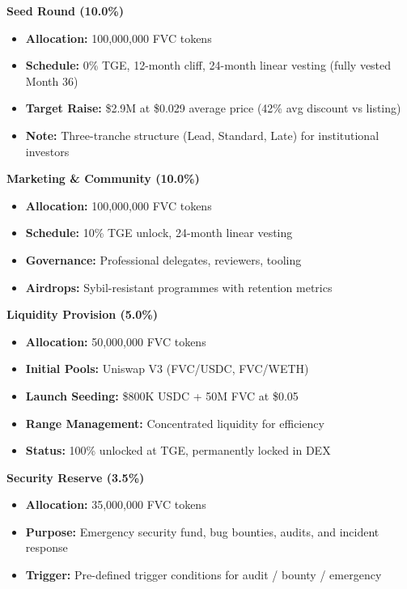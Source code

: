 \documentclass[
  paper=a4,
  ,captions=tableheading
]{scrartcl}
\providecommand{\tightlist}{%
  \setlength{\itemsep}{0pt}\setlength{\parskip}{0pt}}
\begin{document}
\textbf{Seed Round (10.0\%)}

\begin{itemize}
\tightlist
\item
  \textbf{Allocation:} 100,000,000 FVC tokens
\item
  \textbf{Schedule:} 0\% TGE, 12-month cliff, 24-month linear vesting (fully vested Month 36)
\item
  \textbf{Target Raise:} \$2.9M at \$0.029 average price (42\% avg discount vs listing)
\item
  \textbf{Note:} Three-tranche structure (Lead, Standard, Late) for institutional investors
\end{itemize}

\textbf{Marketing \& Community (10.0\%)}

\begin{itemize}
\tightlist
\item
  \textbf{Allocation:} 100,000,000 FVC tokens
\item
  \textbf{Schedule:} 10\% TGE unlock, 24-month linear vesting
\item
  \textbf{Governance:} Professional delegates, reviewers, tooling
\item
  \textbf{Airdrops:} Sybil-resistant programmes with retention metrics
\end{itemize}

\textbf{Liquidity Provision (5.0\%)}

\begin{itemize}
\tightlist
\item
  \textbf{Allocation:} 50,000,000 FVC tokens
\item
  \textbf{Initial Pools:} Uniswap V3 (FVC/USDC, FVC/WETH)
\item
  \textbf{Launch Seeding:} \$800K USDC + 50M FVC at \$0.05
\item
  \textbf{Range Management:} Concentrated liquidity for efficiency
\item
  \textbf{Status:} 100\% unlocked at TGE, permanently locked in DEX
\end{itemize}

\textbf{Security Reserve (3.5\%)}

\begin{itemize}
\tightlist
\item
  \textbf{Allocation:} 35,000,000 FVC tokens
\item
  \textbf{Purpose:} Emergency security fund, bug bounties, audits, and incident response
\item
  \textbf{Trigger:} Pre-defined trigger conditions for audit / bounty / emergency
\end{itemize}
\end{document}
